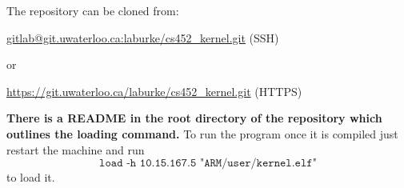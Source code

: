 \documentclass{amsart}
\begin{document}
\noindent The repository can be cloned from:

\url{gitlab@git.uwaterloo.ca:laburke/cs452_kernel.git} (SSH)

or

\url{https://git.uwaterloo.ca/laburke/cs452_kernel.git} (HTTPS)

\textbf{There is a README in the root directory of the repository which outlines
the loading command.} To run the program once it is compiled just restart the
machine and run \[\texttt{load -h 10.15.167.5 "ARM/user/kernel.elf"}\] to load
it.
\end{document}
